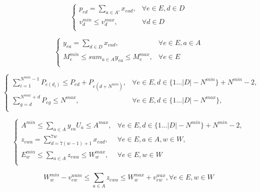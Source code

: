 \begin{equation}\label{dois}
 \left \{
\begin{matrix}
p_{ed} = \sum_{a \in A'} x_{ead}, & \forall e \in E, d \in D \\

v_d^{min} \leq v_d^{max}, & \forall d \in D \\
\end{matrix}
\right.
\end{equation}

\begin{equation}\label{tresa}
 \left \{
\begin{matrix}
y_{ea} = \sum_{d \in D} x_{ead}, & \forall e \in E, a \in A \\

M_e^{min} \leq sum_{a \in A} y_{ea} \leq M_e^{max}, & \forall e \in E\\
\end{matrix}
\right.
\end{equation}

\begin{equation}\label{tresb}
 \left \{
\begin{matrix}
\sum_{i=1}^{N^{min}-1} P_{e(d_i)} \leq P_{ed} + P_{e(d+N^{min})}, & \forall e \in E, d \in \{ 1 ... |D|-N^{min} \} + N^{min}-2, \\

\sum_{g=d}^{N^{max}+d} P_{eg} \leq N^{max}, & \forall e \in E, d \in \{ 1 ... |D|-N^{max} \},\\
\end{matrix}
\right.
\end{equation}

\begin{equation}\label{tresc}
 \left \{
\begin{matrix}

A^{min} \leq \sum_{a \in A} y_{ea}U_a \leq A^{max}, & \forall e \in E, d \in \{ 1 ... |D|-N^{min} \} + N^{min}-2, \\

z_{ewa} = \sum_{d=7(w-1)+1}^{7w} x_{ead}, & \forall e \in E, a \in A, w \in W,\\

E_w^{min} \leq \sum_{a \in A} z_{ewa} \leq W_w^{max}, & \forall e \in E, w \in W \\

\end{matrix}
\right.
\end{equation}

\begin{equation}\label{tresd}
W_w^{min} - v_{ew}^{wam} \leq \sum_{a \in A} z_{ewa} \leq W_w^{max} + v_{ew}^{wax}, \forall e \in E, w \in W
\end{equation}

